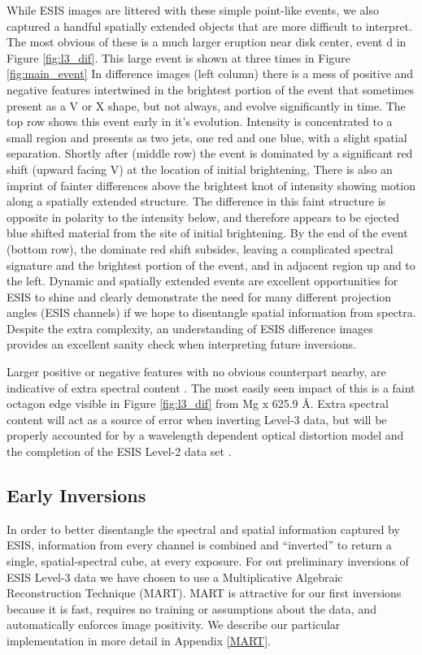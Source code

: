 {    	While ESIS images are littered with these simple point-like events, we also captured a handful spatially extended objects that are more difficult to interpret.
    	The most obvious of these is a much larger eruption near disk center, event d in Figure \ref{fig:l3_dif}.
    	This large event is shown at three times in Figure \ref{fig:main_event}
    	In difference images (left column) there is a mess of positive and negative features intertwined in the brightest portion of the event that sometimes present as a V or X shape, but not always, and evolve significantly in time.
    	The top row shows this event early in it's evolution. 
    	Intensity is concentrated to a small region and presents as two jets, one red and one blue, with a slight spatial separation.
    	Shortly after (middle row) the event is dominated by a significant red shift (upward facing V) at the location of initial brightening, 
    	There is also an imprint of fainter differences above the brightest knot of intensity showing motion along a spatially extended structure.
    	The difference in this faint structure is opposite in polarity to the intensity below, and therefore appears to be ejected blue shifted material from the site of initial brightening.
    	By the end of the event (bottom row), the dominate red shift subsides, leaving a complicated spectral signature and the brightest portion of the event, and in adjacent region up and to the left.  
    	Dynamic and spatially extended events are excellent opportunities for ESIS to shine and clearly demonstrate the need for many different projection angles (ESIS channels) if we hope to disentangle spatial information from spectra.
    	Despite the extra complexity, an understanding of ESIS difference images provides an excellent sanity check when interpreting future inversions.
    	
    
    	Larger positive or negative features with no obvious counterpart nearby, are indicative of extra spectral content \citep{RustPhD,Parker2021}.
    	The most easily seen impact of this is a faint octagon edge visible in Figure \ref{fig:l3_dif} from Mg {\sc x} 625.9 \AA.
    	Extra spectral content will act as a source of error when inverting Level-3 data, but will be properly accounted for by a wavelength dependent optical distortion model and the completion of the ESIS Level-2 data set \citep{Smart2022}. 	 
    
    
    \subsection{Early Inversions}
    	In order to better disentangle the spectral and spatial information captured by ESIS, information from every channel is combined and ``inverted'' to return a single, spatial-spectral cube, at every exposure.
    	For out preliminary inversions of ESIS Level-3 data we have chosen to use a Multiplicative Algebraic Reconstruction Technique (MART).
    	MART is attractive for our first inversions because it is fast, requires no training or assumptions about the data, and automatically enforces image  positivity.
    	We describe our particular implementation in more detail in Appendix \ref{MART}.
    	
}
